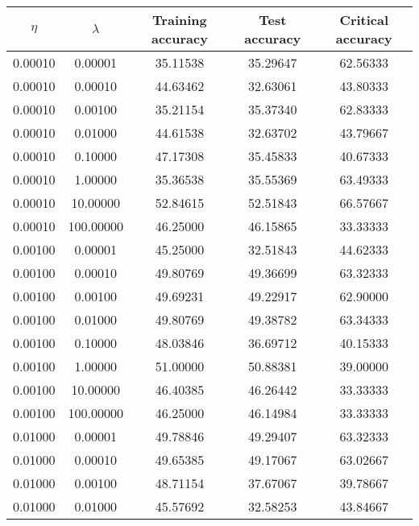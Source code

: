 \begin{tabular}{ccccc}
\hline \hline
 $\eta$ &  $\lambda$ &  Training accuracy &  Test accuracy &  Critical accuracy \\
\hline \hline
0.00010 &    0.00001 &           35.11538 &       35.29647 &           62.56333 \\
0.00010 &    0.00010 &           44.63462 &       32.63061 &           43.80333 \\
0.00010 &    0.00100 &           35.21154 &       35.37340 &           62.83333 \\
0.00010 &    0.01000 &           44.61538 &       32.63702 &           43.79667 \\
0.00010 &    0.10000 &           47.17308 &       35.45833 &           40.67333 \\
0.00010 &    1.00000 &           35.36538 &       35.55369 &           63.49333 \\
0.00010 &   10.00000 &           52.84615 &       52.51843 &           66.57667 \\
0.00010 &  100.00000 &           46.25000 &       46.15865 &           33.33333 \\
0.00100 &    0.00001 &           45.25000 &       32.51843 &           44.62333 \\
0.00100 &    0.00010 &           49.80769 &       49.36699 &           63.32333 \\
0.00100 &    0.00100 &           49.69231 &       49.22917 &           62.90000 \\
0.00100 &    0.01000 &           49.80769 &       49.38782 &           63.34333 \\
0.00100 &    0.10000 &           48.03846 &       36.69712 &           40.15333 \\
0.00100 &    1.00000 &           51.00000 &       50.88381 &           39.00000 \\
0.00100 &   10.00000 &           46.40385 &       46.26442 &           33.33333 \\
0.00100 &  100.00000 &           46.25000 &       46.14984 &           33.33333 \\
0.01000 &    0.00001 &           49.78846 &       49.29407 &           63.32333 \\
0.01000 &    0.00010 &           49.65385 &       49.17067 &           63.02667 \\
0.01000 &    0.00100 &           48.71154 &       37.67067 &           39.78667 \\
0.01000 &    0.01000 &           45.57692 &       32.58253 &           43.84667 \\

\end{tabular}
